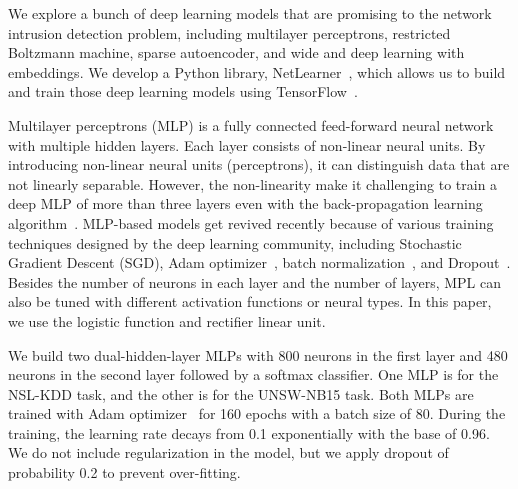 \label{CDL:Sec:Architectures}

We explore a bunch of deep learning models that are promising to the
network intrusion detection problem, including multilayer perceptrons, restricted Boltzmann machine, sparse autoencoder, and wide and deep learning with embeddings. We develop a Python library, NetLearner~\cite{NetLearner}, which allows us to build and train those deep learning models using TensorFlow~\cite{TensorFlow}.

\label{CDL:SubSec:MLP}
Multilayer perceptrons (MLP) is a fully connected feed-forward neural network with multiple hidden layers.
Each layer consists of non-linear neural units.
By introducing non-linear neural units (perceptrons), it can distinguish data that are not linearly separable.
However, the non-linearity make it challenging to train a deep MLP of more than three layers even with the back-propagation learning algorithm~\cite{Backpropagation}.
MLP-based models get revived recently because of various training techniques designed by the deep learning community, including Stochastic Gradient Descent (SGD), Adam optimizer~\cite{Adam},
batch normalization~\cite{BatchNorm}, and Dropout~\cite{Dropout}.
Besides the number of neurons in each layer and the number of layers,
MPL can also be tuned with different activation functions or neural types.
In this paper, we use the logistic function and rectifier linear unit.

We build two dual-hidden-layer MLPs with 800 neurons in the first layer and 480 neurons in the second layer followed by a softmax classifier.
One MLP is for the NSL-KDD task, and the other is for the UNSW-NB15 task.
Both MLPs are trained with Adam optimizer~\cite{Adam} for 160 epochs with a batch size of 80.
During the training, the learning rate decays from 0.1 exponentially with the base of 0.96.
We do not include regularization in the model, but we apply dropout of probability 0.2 to prevent over-fitting.



